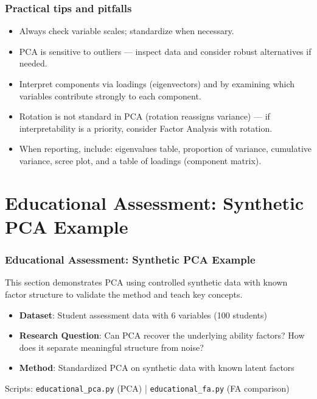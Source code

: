 \documentclass[aspectratio=169]{beamer}
\begin{document}
\begin{frame}
    \frametitle{Practical tips and pitfalls}
    \begin{itemize}
        \item Always check variable scales; standardize when necessary. \pause
        \item PCA is sensitive to outliers — inspect data and consider robust alternatives if needed. \pause
        \item Interpret components via loadings (eigenvectors) and by examining which variables contribute strongly to each component. \pause
        \item Rotation is not standard in PCA (rotation reassigns variance) — if interpretability is a priority, consider Factor Analysis with rotation. \pause
        \item When reporting, include: eigenvalues table, proportion of variance, cumulative variance, scree plot, and a table of loadings (component matrix). \pause
    \end{itemize}
\end{frame}

\section{Educational Assessment: Synthetic PCA Example}

\begin{frame}
    \frametitle{Educational Assessment: Synthetic PCA Example}
    This section demonstrates PCA using controlled synthetic data with known factor structure to validate the method and teach key concepts.
    \begin{itemize}
        \item \textbf{Dataset}: Student assessment data with 6 variables (100 students) \pause
        \item \textbf{Research Question}: Can PCA recover the underlying ability factors? How does it separate meaningful structure from noise? \pause
        \item \textbf{Method}: Standardized PCA on synthetic data with known latent factors \pause
    \end{itemize}
    \vspace{6pt}
    Scripts: \texttt{educational\_pca.py} (PCA) | \texttt{educational\_fa.py} (FA comparison)
\end{frame}
\end{document}
